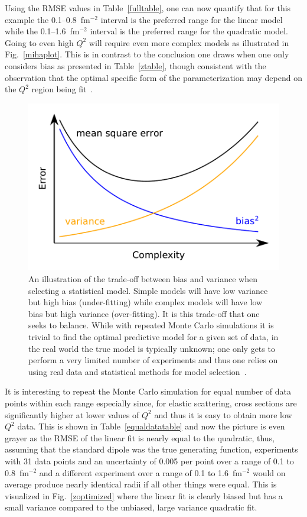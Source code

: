 \documentclass[10pt,superscriptaddress,aps,prc,twocolumn]{revtex4-1}
\begin{document}
Using the RMSE values in Table~\ref{fulltable}, one can now quantify 
that for this example the 0.1--0.8~fm$^{-2}$ interval is the preferred range for the linear model 
while the 0.1--1.6~fm$^{-2}$ interval is the preferred range for the quadratic model.   Going to even
high $Q^2$ will require even more complex models as illustrated in Fig.~\ref{mihaplot}.
This is in contrast to the conclusion one draws when one only considers bias as presented in Table~\ref{ztable},
though consistent with the observation that the optimal specific form of the parameterization 
may depend on the $Q^2$ region being fit~\cite{Alberico:2008sz}.
\begin{figure}
\includegraphics[width=\columnwidth]{Figure/biasvariance-clean.pdf}
\caption{An illustration of the trade-off between bias and variance when selecting a statistical model.   Simple models
will have low variance but high bias (under-fitting) while complex models will have low bias but high variance (over-fitting).   
It is this trade-off that one seeks to balance.   While with repeated  Monte Carlo simulations it is trivial to find the optimal
predictive model for a given set of data, in the real world the true model is typically unknown; one only gets to perform
a very limited number of experiments and thus one relies on using real data and statistical methods for 
model selection~\cite{Hastie:2009}.}
\label{biasvariance}
\end{figure}

It is interesting to repeat the Monte Carlo simulation for equal number of data points within each range
especially since, for elastic scattering, cross sections are significantly higher at lower values of $Q^2$
and thus it is easy to obtain more low $Q^2$ data.
This is shown in Table~\ref{equaldatatable} and now the picture is even grayer as the RMSE of the linear 
fit is nearly equal to the quadratic, thus, assuming that the standard dipole was the true generating function,  experiments
with 31 data points and an uncertainty of 0.005 per point over a range of 0.1 to 0.8~fm$^{-2}$ and a different experiment
over a range of 0.1 to 1.6~fm$^{-2}$ would on average produce nearly identical radii if all other things were equal.
This is visualized in Fig.~\ref{zoptimized} where the linear fit is clearly biased but has a small variance compared to
the unbiased, large variance quadratic fit.
\end{document}
